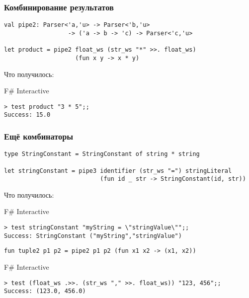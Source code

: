 \documentclass[xetex,mathserif,serif]{beamer}
\begin{document}
    \begin{frame}[fragile]
        \frametitle{Комбинирование результатов}
        \begin{verbatim}
val pipe2: Parser<'a,'u> -> Parser<'b,'u> 
                  -> ('a -> b -> 'c) -> Parser<'c,'u>

let product = pipe2 float_ws (str_ws "*" >>. float_ws)
                    (fun x y -> x * y)
        \end{verbatim}
        Что получилось:
        \begin{alertblock}{F\# Interactive}
            \begin{verbatim}
> test product "3 * 5";;
Success: 15.0
            \end{verbatim}
        \end{alertblock}
    \end{frame}

    \begin{frame}[fragile]
        \frametitle{Ещё комбинаторы}
        \begin{verbatim}
type StringConstant = StringConstant of string * string

let stringConstant = pipe3 identifier (str_ws "=") stringLiteral
                           (fun id _ str -> StringConstant(id, str))
        \end{verbatim}
        Что получилось:
        \begin{alertblock}{F\# Interactive}
            \begin{verbatim}
> test stringConstant "myString = \"stringValue\"";;
Success: StringConstant ("myString","stringValue")
            \end{verbatim}
        \end{alertblock}

        \begin{verbatim}
fun tuple2 p1 p2 = pipe2 p1 p2 (fun x1 x2 -> (x1, x2))
        \end{verbatim}

        \begin{alertblock}{F\# Interactive}
            \begin{verbatim}
> test (float_ws .>>. (str_ws "," >>. float_ws)) "123, 456";;
Success: (123.0, 456.0)
            \end{verbatim}
        \end{alertblock}
    \end{frame}
\end{document}

